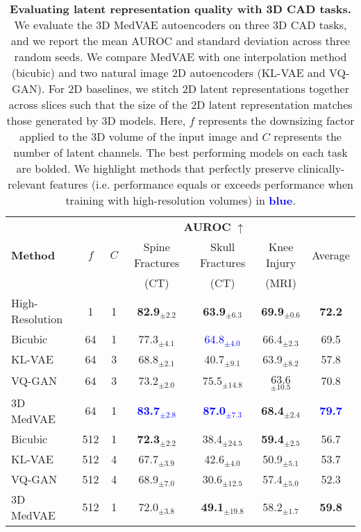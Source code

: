 \begin{table*}[ht]
\centering
{%
\begin{tabular}{ lcccccc }
\toprule
\textbf{}
& \multicolumn{2}{c}{\textbf{}}
& \multicolumn{3}{c}{\textbf{AUROC} $\uparrow$}
& \textbf{}
\\
\cmidrule(l{3pt}r{0pt}){4-6}
\cmidrule(l{3pt}r{0pt}){7-7}
\textbf{Method}
& \textbf{$f$}
& \textbf{$C$}
& \small Spine Fractures
& \small Skull Fractures
& \small Knee Injury
& Average
\\ 
 & & &  \small (CT) & \small (CT) & \small (MRI) &
\\
\midrule
\small High-Resolution & 1 & 1  & \textbf{82.9$_{\pm2.2}$} & \textbf{63.9$_{\pm6.3}$} & \textbf{69.9$_{\pm0.6}$} & \textbf{72.2}\\

\midrule
\small Bicubic & 64 & 1  &  77.3$_{\pm4.1}$ & \textcolor{blue}{64.8$_{\pm4.0}$} & 66.4$_{\pm2.3}$ & 69.5\\
\small KL-VAE & 64 & 3   & 68.8$_{\pm2.1}$ & 40.7$_{\pm9.1}$ & 63.9$_{\pm8.2}$  &  57.8\\
\small VQ-GAN & 64 & 3 & 73.2$_{\pm2.0}$  & 75.5$_{\pm14.8}$ & 63.6$_{\pm10.5}$ &   70.8 \\
\small 3D MedVAE & 64 & 1  & \textcolor{blue}{\textbf{83.7$_{\pm2.8}$}} & \textcolor{blue}{\textbf{87.0$_{\pm7.3}$}} & \textbf{68.4$_{\pm2.4}$} & \textcolor{blue}{\textbf{79.7}}\\
\midrule
\small Bicubic & 512 & 1 & \textbf{72.3$_{\pm2.2}$} & 38.4$_{\pm24.5}$ & \textbf{59.4$_{\pm2.5}$} & 56.7\\
\small KL-VAE & 512 & 4  & 67.7$_{\pm3.9}$ & 42.6$_{\pm4.0}$ & 50.9$_{\pm5.1}$ & 53.7\\
\small VQ-GAN & 512 & 4  & 68.9$_{\pm7.0}$ & 30.6$_{\pm12.5}$ & 57.4$_{\pm5.0}$ & 52.3 \\
\small 3D MedVAE & 512 & 1  & 72.0$_{\pm3.8}$ & \textbf{49.1$_{\pm19.8}$} & 58.2$_{\pm1.7}$ & \textbf{59.8} \\
\bottomrule
\end{tabular}
}
\caption{\textbf{Evaluating latent representation quality with 3D CAD tasks.} We evaluate the 3D MedVAE autoencoders on three 3D CAD tasks, and we report the mean AUROC and standard deviation across three random seeds. We compare MedVAE with one interpolation method (bicubic) and two natural image 2D autoencoders (KL-VAE and VQ-GAN). For 2D baselines, we stitch 2D latent representations together across slices such that the size of the 2D latent representation matches those generated by 3D models. Here, $f$ represents the downsizing factor applied to the 3D volume of the input image and $C$ represents the number of latent channels. The best performing models on each task are bolded. We highlight methods that perfectly preserve clinically-relevant features (i.e. performance equals or exceeds performance when training with high-resolution volumes) in \textcolor{blue}{\textbf{blue}}.}
\label{table:3D_latent_cls}
\vspace{-1mm}
\end{table*}





